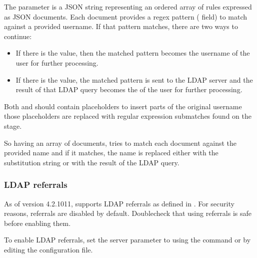 \documentclass[letterpaper,10pt,english]{sphinxmanual}
\begin{document}
\sphinxAtStartPar
The  parameter is a JSON string representing an ordered array of rules expressed as JSON documents. Each document provides a regex pattern ( field) to match against a provided username. If that pattern matches, there are two ways to continue:
\begin{itemize}
\item {} 
\sphinxAtStartPar
If there is the  value, then the matched pattern becomes the username of the user for further processing.

\item {} 
\sphinxAtStartPar
If there is the  value, the matched pattern is sent to the LDAP server and the result of that LDAP query becomes the  of the user for further processing.

\end{itemize}

\sphinxAtStartPar
Both  and  should contain placeholders to insert parts of the original username \textendash{} those placeholders are replaced with regular expression submatches found on the  stage.

\sphinxAtStartPar
So having an array of documents,  tries to match each document against the provided name and if it matches, the name is replaced either with the substitution string or with the result of the LDAP query.
\subsubsection*{LDAP referrals}

\sphinxAtStartPar
As of version 4.2.10\sphinxhyphen{}11,  supports LDAP referrals as defined in . For security reasons, referrals are disabled by default. Double\sphinxhyphen{}check that using referrals is safe before enabling them.

\sphinxAtStartPar
To enable LDAP referrals, set the  server parameter to  using the {\hyperref[\detokenize{set-parameter:setparameter}]{}} command or by editing the configuration file.
\end{document}
